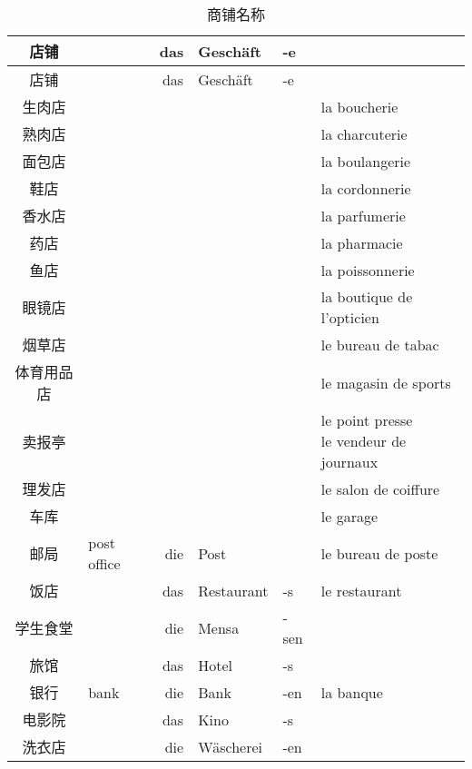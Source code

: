 \documentclass[12pt,A4paper,oneside,reqno]{amsart}
\numberwithin{equation}{section}
\theoremstyle{plain}
\theoremstyle{plain}
\theoremstyle{plain}
\numberwithin{equation}{section}
\theoremstyle{remark}
\begin{document}
	\begin{longtable}{c|l|rll|l}
	\hline
店铺	&		&	das	&	Gesch\"{a}ft	&	-e	&		\\

	\hline
	\endhead
	\hline
店铺	&		&	das	&	Gesch\"{a}ft	&	-e	&		\\

	\hline
	\endfirsthead	
	\hline
	\endfoot
	\hline		
	\caption{商铺名称}
	\endlastfoot				
生肉店	&		&		&		&		&	la boucherie	\\
熟肉店	&		&		&		&		&	la charcuterie	\\
面包店	&		&		&		&		&	la boulangerie	\\
鞋店	&		&		&		&		&	la cordonnerie	\\
香水店	&		&		&		&		&	la parfumerie	\\
药店	&		&		&		&		&	la pharmacie	\\
鱼店	&		&		&		&		&	la poissonnerie	\\
眼镜店	&		&		&		&		&	la boutique de l'opticien	\\
烟草店	&		&		&		&		&	le bureau de tabac	\\
体育用品店	&		&		&		&		&	le magasin de sports	\\
卖报亭	&		&		&		&		&	\thead{le point presse\\le vendeur de journaux}	\\
理发店	&		&		&		&		&	le salon de coiffure	\\
车库	&		&		&		&		&	le garage	\\
邮局	&	post office	&	die	&	Post	&		&	le bureau de poste	\\
饭店	&		&	das	&	Restaurant	&	-s	&	le restaurant	\\
学生食堂	&		&	die	&	Mensa	&	-sen	&		\\
旅馆	&		&	das	&	Hotel	&	-s	&		\\
银行	&	bank	&	die	&	Bank	&	-en	&	la banque	\\
电影院	&		&	das	&	Kino	&	-s	&		\\
洗衣店	&		&	die	&	W\"{a}scherei	&	-en	&		\\


	
	
	
	
	
\end{longtable}
\end{document}

